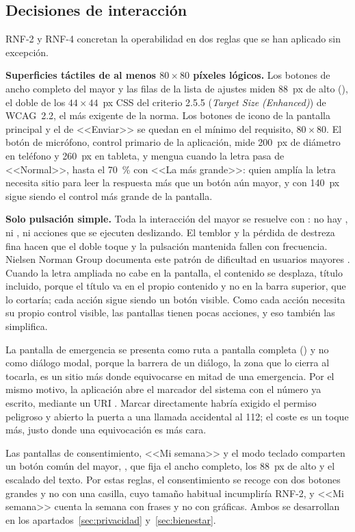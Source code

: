 \subsection{Decisiones de interacción}

RNF-2 y RNF-4 concretan la operabilidad en dos reglas que se han aplicado sin excepción.

\textbf{Superficies táctiles de al menos $80\times80$ píxeles lógicos.} Los botones de ancho completo del mayor y las filas de la lista de ajustes miden 88~px de alto (), el doble de los $44\times44$~px CSS del criterio 2.5.5 (\emph{Target Size (Enhanced)}) de WCAG~2.2, el más exigente de la norma. Los botones de icono de la pantalla principal y el de <<Enviar>> se quedan en el mínimo del requisito, $80\times80$. El botón de micrófono, control primario de la aplicación, mide 200~px de diámetro en teléfono y 260~px en tableta, y mengua cuando la letra pasa de <<Normal>>, hasta el 70~\% con <<La más grande>>: quien amplía la letra necesita sitio para leer la respuesta más que un botón aún mayor, y con 140~px sigue siendo el control más grande de la pantalla.

\textbf{Solo pulsación simple.} Toda la interacción del mayor se resuelve con : no hay , ni , ni acciones que se ejecuten deslizando. El temblor y la pérdida de destreza fina hacen que el doble toque y la pulsación mantenida fallen con frecuencia. Nielsen Norman Group documenta este patrón de dificultad en usuarios mayores \autocite{Kane2019}. Cuando la letra ampliada no cabe en la pantalla, el contenido se desplaza, título incluido, porque el título va en el propio contenido y no en la barra superior, que lo cortaría; cada acción sigue siendo un botón visible. Como cada acción necesita su propio control visible, las pantallas tienen pocas acciones, y eso también las simplifica.

La pantalla de emergencia se presenta como ruta a pantalla completa () y no como diálogo modal, porque la barrera de un diálogo, la zona que lo cierra al tocarla, es un sitio más donde equivocarse en mitad de una emergencia. Por el mismo motivo, la aplicación abre el marcador del sistema con el número ya escrito, mediante un URI . Marcar directamente habría exigido el permiso peligroso  y abierto la puerta a una llamada accidental al 112; el coste es un toque más, justo donde una equivocación es más cara.

Las pantallas de consentimiento, <<Mi semana>> y el modo teclado comparten un botón común del mayor, , que fija el ancho completo, los 88~px de alto y el escalado del texto. Por estas reglas, el consentimiento se recoge con dos botones grandes y no con una casilla, cuyo tamaño habitual incumpliría RNF-2, y <<Mi semana>> cuenta la semana con frases y no con gráficas. Ambos se desarrollan en los apartados~\ref{sec:privacidad} y~\ref{sec:bienestar}.

